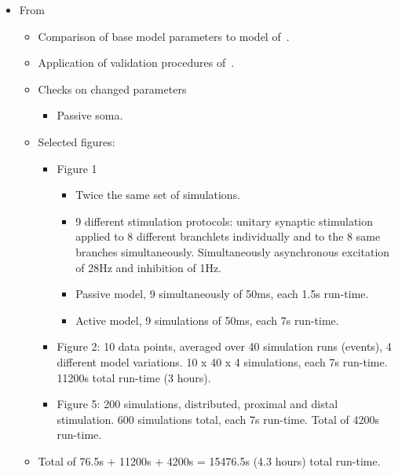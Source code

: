 \documentclass[12pt]{article}
\begin{document}
\begin{itemize}
\begin{itemize}
  \end{itemize}

\item From~\cite{schutter94:_simul_purkin}

  \begin{itemize}
  \item Comparison of base model parameters to model
    of~\cite{E:1994hc}.
  \item Application of validation procedures
    of~\cite{De-Schutter-E:1994vn}.
  \item Checks on changed parameters
    \begin{itemize}
    \item Passive soma.
    \end{itemize}
  \item Selected figures:
    \begin{itemize}
    \item Figure 1
      \begin{itemize}
      \item Twice the same set of simulations.
      \item 9 different stimulation protocols: unitary synaptic
        stimulation applied to 8 different branchlets individually and
        to the 8 same branches simultaneously.  Simultaneously
        asynchronous excitation of 28Hz and inhibition of 1Hz.
      \item Passive model, 9 simultaneously of 50ms, each 1.5s
        run-time.
      \item Active model, 9 simulations of 50ms, each 7s run-time.
      \end{itemize}
    \item Figure 2: 10 data points, averaged over 40 simulation runs
      (events), 4 different model variations.  10 x 40 x 4
      simulations, each 7s run-time.  11200s total run-time (3 hours).
    \item Figure 5: 200 simulations, distributed, proximal and distal
      stimulation.  600 simulations total, each 7s run-time.  Total of
      4200s run-time.
    \end{itemize}
  \item Total of 76.5s + 11200s + 4200s = 15476.5s (4.3 hours) total
    run-time.
  \end{itemize}


\end{itemize}
\end{document}
